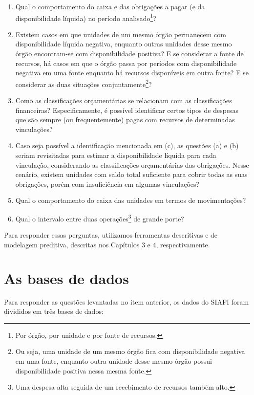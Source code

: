\documentclass[
]{book}
\begin{document}
\begin{enumerate}
\def\labelenumi{\alph{enumi}.}
\item
  Qual o comportamento do caixa e das obrigações a pagar (e da disponibilidade líquida) no período analisado\footnote{Por órgão, por unidade e por fonte de recursos.}?
\item
  Existem casos em que unidades de um mesmo órgão permanecem com disponibilidade líquida negativa, enquanto outras unidades desse mesmo órgão encontram-se com disponibilidade positiva? E se considerar a fonte de recursos, há casos em que o órgão passa por períodos com disponibilidade negativa em uma fonte enquanto há recursos disponíveis em outra fonte? E se considerar as duas situações conjuntamente\footnote{Ou seja, uma unidade de um mesmo órgão fica com disponibilidade negativa em uma fonte, enquanto outra unidade desse mesmo órgão possui disponibilidade positiva nessa mesma fonte.}?
\item
  Como as classificações orçamentárias se relacionam com as classificações financeiras? Especificamente, é possível identificar certos tipos de despesas que são sempre (ou frequentemente) pagas com recursos de determinadas vinculações?
\item
  Caso seja possível a identificação mencionada em (c), as questões (a) e (b) seriam revisitadas para estimar a disponibilidade líquida para cada vinculação, considerando as classificações orçamentárias das obrigações. Nesse cenário, existem unidades com saldo total suficiente para cobrir todas as suas obrigações, porém com insuficiência em algumas vinculações?
\item
  Qual o comportamento do caixa das unidades em termos de movimentações?
\item
  Qual o intervalo entre duas operações\footnote{Uma despesa alta seguida de um recebimento de recursos também alto.} de grande porte?
\end{enumerate}

Para responder essas perguntas, utilizamos ferramentas descritivas e de modelagem preditiva, descritas nos Capítulos 3 e 4, respectivamente.

\hypertarget{as-bases-de-dados}{%
\section{As bases de dados}\label{as-bases-de-dados}}

Para responder as questões levantadas no item anterior, os dados do SIAFI foram divididos em três bases de dados:
\end{document}
